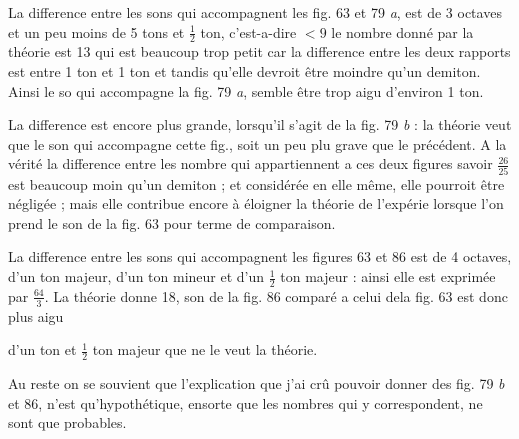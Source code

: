 \documentclass[11pt,a4paper]{article}
\begin{document}
La difference entre les sons qui accompagnent les fig. 63 et 79 \emph{a},
est de 3 octaves et un peu moins de 5 tons et $\frac{1}{2}$ ton, c'est-a-dire $<9$
le nombre donné par la théorie est 13 qui est beaucoup trop petit
car la difference entre les deux rapports est entre 1 ton et 1 ton et
tandis qu'elle devroit être moindre qu'un demiton. Ainsi le so
qui accompagne la fig. 79 \emph{a}, semble être trop aigu d'environ 1 ton.

La difference est encore plus grande, lorsqu'il s'agit de la fig. 79 \emph{b} :
la théorie veut que le son qui accompagne cette fig., soit un peu plu
grave que le précédent. A la vérité la difference entre les nombre
qui appartiennent a ces deux figures savoir $\frac{26}{25}$ est beaucoup moin
qu'un demiton ; et considérée en elle même, elle pourroit être
négligée ; mais elle contribue encore à éloigner la théorie de l'expérie
lorsque l'on prend le son de la fig. 63 pour terme de comparaison.

La difference entre les sons qui accompagnent les figures 63 et 86
est de 4 octaves, d'un ton majeur, d'un ton mineur et d'un $\frac{1}{2}$ ton
majeur : ainsi elle est exprimée par $\frac{64}{3}$. La théorie donne 18, 
son de la fig. 86 comparé a celui dela fig. 63 est donc plus aigu


d'un ton et $\frac{1}{2}$ ton majeur que ne le veut la théorie.

Au reste on se souvient que l'explication que j'ai crû pouvoir donner
des fig. 79 \emph{b} et 86, n'est qu'hypothétique, ensorte que les nombres qui y
correspondent, ne sont que probables.
\end{document}
